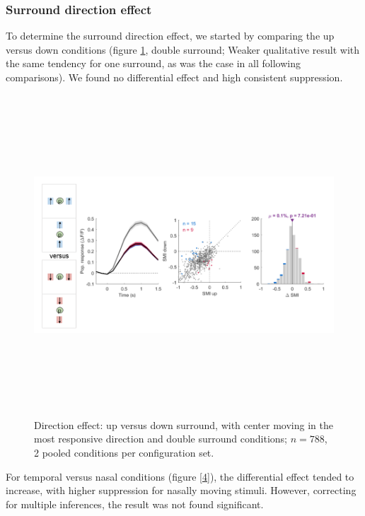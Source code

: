 \subsubsection{Surround direction effect}

To determine the surround direction effect, we started by comparing the up versus down conditions (figure \ref{3}, double surround; Weaker qualitative result with the same tendency for one surround, as was the case in all following comparisons). We found no differential effect and high consistent suppression.

\begin{figure}[H] \centering \includegraphics[width=12cm,height=12cm,keepaspectratio]{Figures/7.Results/finalPopulation/sel/diagrams/3.png} 
\caption{Direction effect: up versus down surround, with center moving in the most responsive direction and double surround conditions;  $n=788$, 2 pooled conditions per configuration set.}
\label{3} 
\end{figure}

For temporal versus nasal conditions (figure \ref{4}), the differential effect tended to increase, with higher suppression for nasally moving stimuli. However, correcting for multiple inferences, the result was not found significant.

